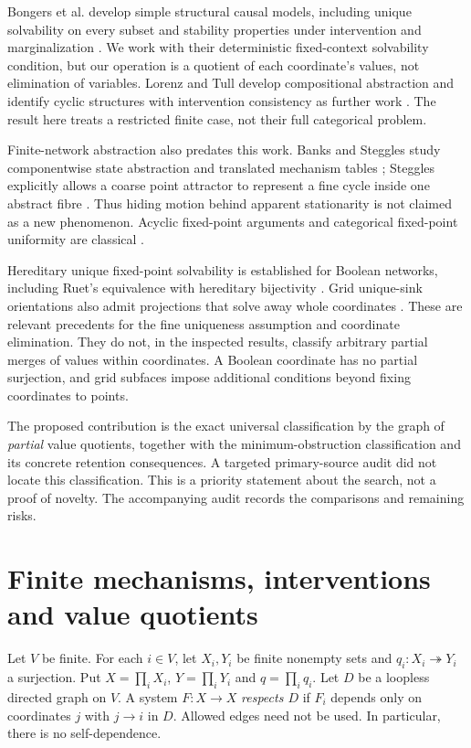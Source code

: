 \documentclass[11pt,a4paper]{article}
\theoremstyle{definition}
\theoremstyle{remark}
\begin{document}
Bongers et al. develop simple structural causal models, including unique solvability on every subset and stability properties under intervention and marginalization \cite{bongers}. We work with their deterministic fixed-context solvability condition, but our operation is a quotient of each coordinate's values, not elimination of variables. Lorenz and Tull develop compositional abstraction and identify cyclic structures with intervention consistency as further work \cite{lorenz-tull}. The result here treats a restricted finite case, not their full categorical problem.

Finite-network abstraction also predates this work. Banks and Steggles study componentwise state abstraction and translated mechanism tables \cite{banks-steggles}; Steggles explicitly allows a coarse point attractor to represent a fine cycle inside one abstract fibre \cite{steggles}. Thus hiding motion behind apparent stationarity is not claimed as a new phenomenon. Acyclic fixed-point arguments and categorical fixed-point uniformity are classical \cite{richard,simpson-plotkin}.

Hereditary unique fixed-point solvability is established for Boolean networks, including Ruet's equivalence with hereditary bijectivity \cite{ruet}. Grid unique-sink orientations also admit projections that solve away whole coordinates \cite{gaertner}. These are relevant precedents for the fine uniqueness assumption and coordinate elimination. They do not, in the inspected results, classify arbitrary partial merges of values within coordinates. A Boolean coordinate has no partial surjection, and grid subfaces impose additional conditions beyond fixing coordinates to points.

The proposed contribution is the exact universal classification by the graph of \emph{partial} value quotients, together with the minimum-obstruction classification and its concrete retention consequences. A targeted primary-source audit did not locate this classification. This is a priority statement about the search, not a proof of novelty. The accompanying audit records the comparisons and remaining risks.

\section{Finite mechanisms, interventions and value quotients}

Let $V$ be finite. For each $i\in V$, let $X_i,Y_i$ be finite nonempty sets and $q_i:X_i\twoheadrightarrow Y_i$ a surjection. Put $X=\prod_iX_i$, $Y=\prod_iY_i$ and $q=\prod_iq_i$. Let $D$ be a loopless directed graph on $V$. A system $F:X\to X$ \emph{respects $D$} if $F_i$ depends only on coordinates $j$ with $j\to i$ in $D$. Allowed edges need not be used. In particular, there is no self-dependence.
\end{document}
